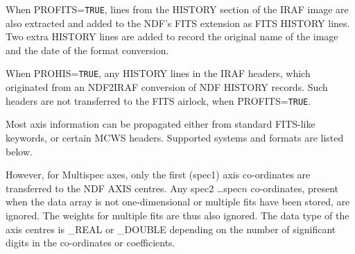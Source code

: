 {{{         \sstitem
         When PROFITS={\tt TRUE}, lines from the HISTORY section of the IRAF
         image are also extracted and added to the NDF's FITS extension as
         FITS HISTORY lines.  Two extra HISTORY lines are added to record
         the original name of the image and the date of the format
         conversion.

         \sstitem
         When PROHIS={\tt TRUE}, any HISTORY lines in the IRAF headers, which
         originated from an NDF2IRAF conversion of NDF HISTORY records.
         Such headers are not transferred to the FITS airlock, when
         PROFITS={\tt TRUE}.

         \sstitem
         Most axis information can be propagated either from standard
         FITS-like keywords, or certain MCWS headers.  Supported systems
         and formats are listed below.


         However, for Multispec axes, only the first (spec1) axis
         co-ordinates are transferred to the NDF AXIS centres.  Any
         spec2 \dots spec$n$ co-ordinates, present when the data array is not
         one-dimensional or multiple fits have been stored, are ignored.
         The weights for multiple fits are thus also ignored.  The data
         type of the axis centres is \_REAL or \_DOUBLE depending on the
         number of significant digits in the co-ordinates or coefficients.

}}}
